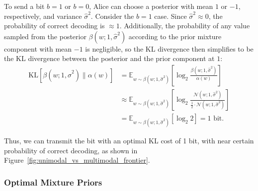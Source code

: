 To send a bit $b=1$ or $b=0$, Alice can choose a posterior with mean $1$ or $-1$, respectively, and variance $\hat{\sigma}^2$.
Consider the $b=1$ case. Since $\hat{\sigma}^2 \approx 0$, the probability of correct decoding is $\approx 1$.
Additionally, the probability of any value sampled from the posterior $\beta(w;1,\hat{\sigma}^2)$ according to the prior mixture component with mean $-1$ is negligible, so the KL divergence then simplifies to be the KL divergence between the posterior and the prior component at $1$:
\begin{align*}
\text{KL}[\beta(w;1,\hat{\sigma}^2) \parallel \alpha(w)] &= \mathbb{E}_{w \sim \beta(w;1,\hat{\sigma}^2)} \left[ \log_2 \frac{\beta(w;1,\hat{\sigma}^2)}{\alpha(w)} \right] \\
&\approx \mathbb{E}_{w \sim \beta(w;1,\hat{\sigma}^2)} \left[ \log_2 \frac{\mathcal{N}(w; 1, \hat{\sigma}^2)}{\frac{1}{2} \cdot \mathcal{N}(w; 1, \hat{\sigma}^2)} \right] \\
&= \mathbb{E}_{w \sim \beta(w;1,\hat{\sigma}^2)} [\log_2 2] = 1 \text{ bit}.
\end{align*}

Thus, we can transmit the bit with an optimal KL cost of 1 bit, with near certain probability of correct decoding, as shown in Figure~\ref{fig:unimodal_vs_multimodal_frontier}. 

\subsubsection{Optimal Mixture Priors}\label{sec:optimal-mixture-priors}

